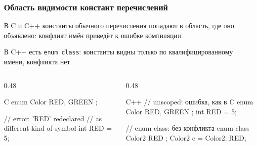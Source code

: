 \documentclass[compress, 8pt, aspectratio=169]{beamer}
\begin{document}
\begin{frame}[fragile]

    \frametitle{Область видимости констант перечислений}

    \begin{myitemize}

        \item В C и C++ константы обычного перечисления
        попадают в область, где оно
        объявлено: конфликт имён приведёт к ошибке
        компиляции.

        \item В C++ есть \texttt{enum class}: константы
        видны только по квалифицированному имени,
        конфликта нет.

    \end{myitemize}

    \begin{columns}[T]

        \begin{column}{0.48\textwidth}

            \begin{mytitledinplacelisting}[minted language=c]{C}
enum Color { RED, GREEN };

// error: 'RED' redeclared
// as different kind of symbol
int RED = 5;
            \end{mytitledinplacelisting}

        \end{column}

        \begin{column}{0.48\textwidth}

            \begin{mytitledinplacelisting}[minted language=c++]{C++}
// unscoped: ошибка, как в C
enum Color { RED, GREEN };
int RED = 5;

// enum class: без конфликта
enum class Color2 { RED };
Color2 c = Color2::RED;
            \end{mytitledinplacelisting}

        \end{column}

    \end{columns}

\end{frame}
\end{document}
